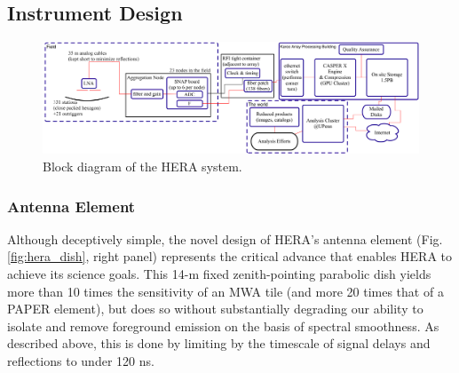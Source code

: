 \documentclass[preprint]{aastex}
\newcommand{\compress}{\vspace{-0.3in}}
\begin{document}
\compress
\subsection{Instrument Design}
\label{InstDes}
%
%

\begin{figure}[t]
\centering
\includegraphics[width=\textwidth]{plots/Engineering/HERA_high_level_block_diagram.png}
\caption{\small
Block diagram of the HERA system.}
\label{fig:blockDiagram} 
\end{figure}

\subsubsection{Antenna Element}

Although deceptively simple, the novel design of HERA's antenna element
(Fig. \ref{fig:hera_dish}, right panel) represents the critical advance
that enables HERA to achieve its science goals.  This 14-m
fixed zenith-pointing parabolic dish yields more than 10 times the
sensitivity of an MWA tile (and more 20 times
that of a PAPER element), but does so without substantially degrading
our ability to isolate and remove foreground emission on the basis of
spectral smoothness.  As described above, this is done by limiting by 
the timescale of signal delays and reflections to under 120 ns.
\end{document}
